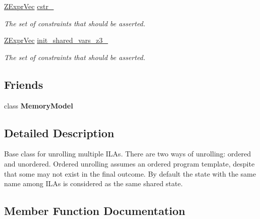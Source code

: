 \begin{DoxyCompactItemize}
\mbox{\label{classilang_1_1_inter_ila_unroller_a19040211712fa2f0584ce55f950aed29}} 
\mbox{\hyperlink{classilang_1_1_inter_ila_unroller_ae83ebf1fea382fb26be5c53052e86ae4}{Z\+Expr\+Vec}} \mbox{\hyperlink{classilang_1_1_inter_ila_unroller_a19040211712fa2f0584ce55f950aed29}{cstr\+\_\+}}
\begin{DoxyCompactList}\small\item\em The set of constraints that should be asserted. \end{DoxyCompactList}\item 
\mbox{\label{classilang_1_1_inter_ila_unroller_a386d5901334665f7318e404944b2965b}} 
\mbox{\hyperlink{classilang_1_1_inter_ila_unroller_ae83ebf1fea382fb26be5c53052e86ae4}{Z\+Expr\+Vec}} \mbox{\hyperlink{classilang_1_1_inter_ila_unroller_a386d5901334665f7318e404944b2965b}{init\+\_\+shared\+\_\+vars\+\_\+z3\+\_\+}}
\begin{DoxyCompactList}\small\item\em The set of constraints that should be asserted. \end{DoxyCompactList}\end{DoxyCompactItemize}
\subsection*{Friends}
\begin{DoxyCompactItemize}
\item 
\mbox{\label{classilang_1_1_inter_ila_unroller_a2a502ee5bc6cd8e1f708dc4b77d85385}} 
class {\bfseries Memory\+Model}
\end{DoxyCompactItemize}


\subsection{Detailed Description}
Base class for unrolling multiple I\+L\+As. There are two ways of unrolling\+: ordered and unordered. Ordered unrolling assumes an ordered program template, despite that some may not exist in the final outcome. By default the state with the same name among I\+L\+As is considered as the same shared state. 

\subsection{Member Function Documentation}
\mbox{\label{classilang_1_1_inter_ila_unroller_a2c4a41a5a7bcd6ec89e757bc12823da7}} 

